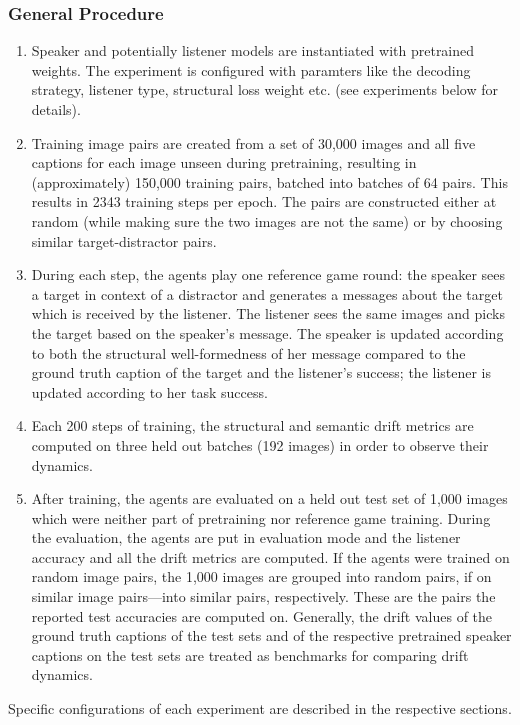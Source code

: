 \subsubsection{General Procedure}
\begin{enumerate}
	\item Speaker and potentially listener models are instantiated with pretrained weights. The experiment is configured with paramters like the decoding strategy, listener type, structural loss weight etc. (see experiments below for details).   
	\item Training image pairs are created from a set of 30,000 images and all five captions for each image unseen during pretraining, resulting in (approximately) 150,000 training pairs, batched into batches of 64 pairs. This results in 2343 training steps per epoch. The pairs are constructed either at random (while making sure the two images are not the same) or by choosing similar target-distractor pairs. 
	\item During each step, the agents play one reference game round: the speaker sees a target in context of a distractor and generates a messages about the target which is received by the listener. The listener sees the same images and picks the target based on the speaker's message. The speaker is updated according to both the structural well-formedness of her message compared to the ground truth caption of the target and the listener's success; the listener is updated according to her task success. 
	\item Each 200 steps of training, the structural and semantic drift metrics are computed on three held out batches (192 images) in order to observe their dynamics.
	\item After training, the agents are evaluated on a held out test set of 1,000 images which were neither part of pretraining nor reference game training. During the evaluation, the agents are put in evaluation mode and the listener accuracy and all the drift metrics are computed. If the agents were trained on random image pairs, the 1,000 images are grouped into random pairs, if on similar image pairs---into similar pairs, respectively. These are the pairs the reported test accuracies are computed on. Generally, the drift values of the ground truth captions of the test sets and of the respective pretrained speaker captions on the test sets are treated as benchmarks for comparing drift dynamics.
\end{enumerate}
Specific configurations of each experiment are described in the respective sections. 

